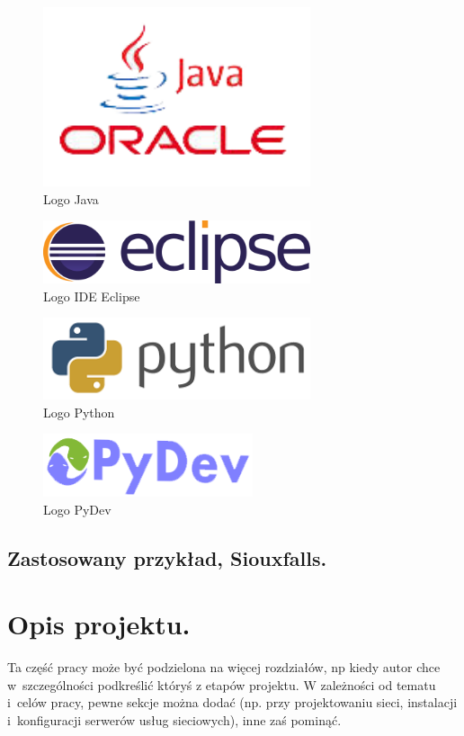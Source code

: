 \documentclass[twoside,12pt]{report}
\begin{document}
\begin{figure}[ht]
\includegraphics[width=0.7\textwidth]{img/java}
\caption{Logo Java\cite{java}}
\end{figure}
\begin{figure}[ht]
\includegraphics[width=0.7\textwidth]{img/eclipse}
\caption{Logo IDE Eclipse\cite{eclipse}}
\end{figure}


\begin{figure}[ht]
\includegraphics[width=0.7\textwidth]{img/py}
\caption{Logo Python\cite{python}}
\end{figure}
\begin{figure}[ht]
\includegraphics[width=0.55\textwidth]{img/pydev}
\caption{Logo PyDev\cite{pydev}}
\end{figure}

\section{Zastosowany przykład, Siouxfalls.}


\chapter{Opis projektu.}
Ta część pracy może być podzielona na więcej rozdziałów, np kiedy autor chce
w~szczególności podkreślić któryś z etapów projektu. W zależności od tematu i~celów pracy, pewne sekcje można dodać (np. przy projektowaniu sieci, instalacji
i~konfiguracji serwerów usług sieciowych), inne zaś pominąć.
\end{document}
